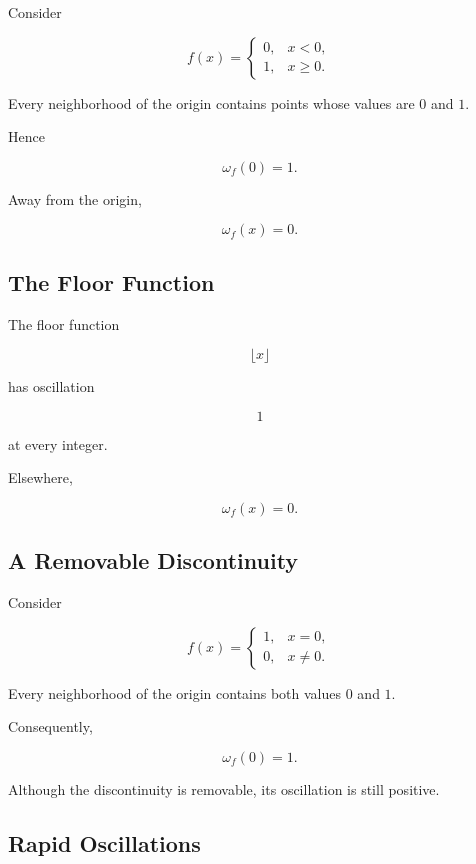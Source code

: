 \documentclass{essay}
\begin{document}
Consider

\[
f(x)=
\begin{cases}
0,&x<0,\\
1,&x\ge0.
\end{cases}
\]

Every neighborhood of the origin contains points whose values are $0$ and $1$.

Hence

\[
\omega_f(0)=1.
\]

Away from the origin,

\[
\omega_f(x)=0.
\]


\subsection{The Floor Function}

The floor function

\[
\lfloor x\rfloor
\]

has oscillation

\[
1
\]

at every integer.

Elsewhere,

\[
\omega_f(x)=0.
\]


\subsection{A Removable Discontinuity}

Consider

\[
f(x)=
\begin{cases}
1,&x=0,\\
0,&x\neq0.
\end{cases}
\]

Every neighborhood of the origin contains both values $0$ and $1$.

Consequently,

\[
\omega_f(0)=1.
\]

Although the discontinuity is removable, its oscillation is still positive.


\subsection{Rapid Oscillations}
\end{document}
